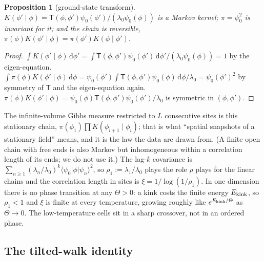 \documentclass[10pt,a4paper]{article}
\newcommand{\Th}{\Theta}
\newcommand{\dd}{\,\mathrm{d}}
\theoremstyle{plain}
\newtheorem{proposition}{Proposition}
\theoremstyle{remark}
\begin{document}
\begin{proposition}[ground-state transform]\label{prop:gs}
$K(\phi'\mid\phi)=\mathsf T(\phi,\phi')\psi_0(\phi')/(\lambda_0\psi_0(\phi))$ is a Markov kernel;
$\pi=\psi_0^2$ is invariant for it; and the chain is reversible, $\pi(\phi)K(\phi'\mid\phi)=\pi(\phi')K(\phi\mid\phi')$.
\end{proposition}
\begin{proof}
$\int K(\phi'\mid\phi)\dd\phi'=\int\mathsf T(\phi,\phi')\psi_0(\phi')\dd\phi'/(\lambda_0\psi_0(\phi))=1$ by the
eigen-equation. $\int\pi(\phi)K(\phi'\mid\phi)\dd\phi=\psi_0(\phi')\int\mathsf T(\phi,\phi')\psi_0(\phi)\dd\phi/\lambda_0=\psi_0(\phi')^2$
by symmetry of $\mathsf T$ and the eigen-equation again. $\pi(\phi)K(\phi'\mid\phi)=\psi_0(\phi)\mathsf T(\phi,\phi')\psi_0(\phi')/\lambda_0$
is symmetric in $(\phi,\phi')$.
\end{proof}
The infinite-volume Gibbs measure restricted to $L$ consecutive sites is this stationary chain,
$\pi(\phi_1)\prod K(\phi_{i+1}\mid\phi_i)$; that is what ``spatial snapshots of a stationary field''
means, and it is the law the data are drawn from. (A finite open chain with free ends is also
Markov but inhomogeneous within a correlation length of its ends; we do not use it.) The lag-$k$
covariance is $\sum_{n\ge1}(\lambda_n/\lambda_0)^k\langle\psi_0|\phi|\psi_n\rangle^2$, so $\rho_1:=\lambda_1/\lambda_0$
plays the role $\rho$ plays for the linear chains and the correlation length in sites is $\xi=1/\log(1/\rho_1)$.
In one dimension there is no phase transition at any $\Th>0$: a kink costs the finite energy $E_{\rm kink}$, so
$\rho_1<1$ and $\xi$ is finite at every temperature, growing roughly like $e^{E_{\rm kink}/\Th}$ as $\Th\to0$. The
low-temperature cells sit in a sharp crossover, not in an ordered phase.

\subsection{The tilted-walk identity}
\end{document}
